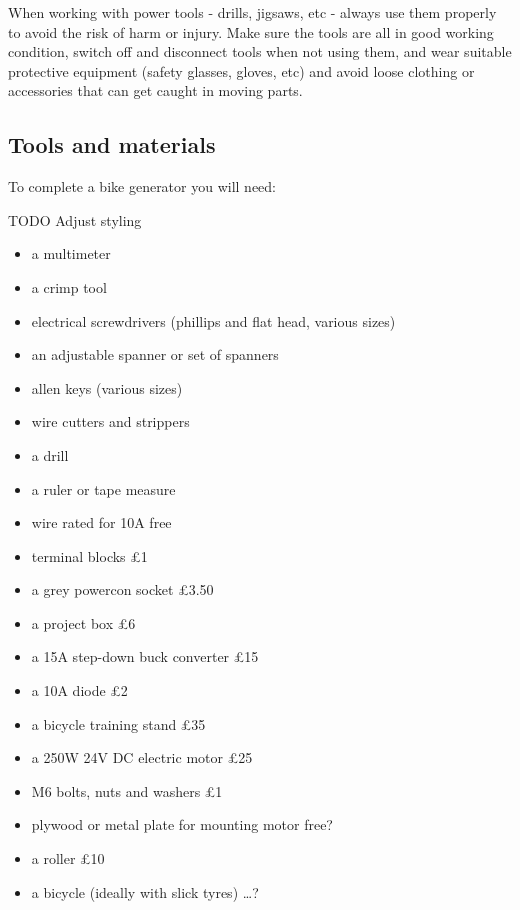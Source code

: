 \documentclass{article}
\theoremstyle{definition}
\theoremstyle{definition}
\theoremstyle{remark}
\begin{document}
    When working with power tools - drills, jigsaws, etc - always use them properly to avoid the risk of harm or injury. Make sure the tools are all in good working condition, switch off and disconnect tools when not using them, and wear suitable protective equipment (safety glasses, gloves, etc) and avoid loose clothing or accessories that can get caught in moving parts.


  {\color{blue}\subsection{Tools and materials}} %
  \label{sub:tools_and_materials}

    To complete a bike generator you will need: 

    TODO Adjust styling

    \begin{itemize}
      \item a multimeter
      \item a crimp tool
      \item electrical screwdrivers (phillips and flat head, various sizes)
      \item an adjustable spanner or set of spanners
      \item allen keys (various sizes)
      \item wire cutters and strippers
      \item a drill
      \item a ruler or tape measure
      \item wire rated for 10A free
      \item terminal blocks £1
      \item a grey powercon socket £3.50
      \item a project box £6
      \item a 15A step-down buck converter £15
      \item a 10A diode £2
      \item a bicycle training stand £35
      \item a 250W 24V DC electric motor £25
      \item M6 bolts, nuts and washers £1
      \item plywood or metal plate for mounting motor free?
      \item a roller £10
      \item a bicycle (ideally with slick tyres) …?
    \end{itemize}
\end{document}
